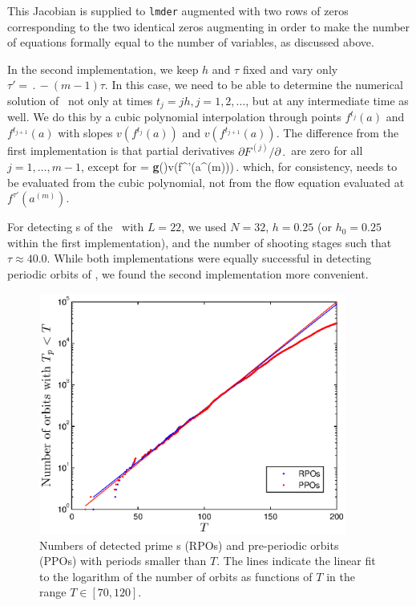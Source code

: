 This Jacobian is supplied to {\tt lmder}
augmented with two rows of zeros corresponding to the two identical
zeros augmenting  in order to make the number of
equations formally equal to the number of variables,
as discussed above.

In the second implementation, we keep $h$ and $\tau$ fixed and vary
only $\tau' = \period{} - (m-1)\tau$.  In this case, we need to be
able to determine the numerical solution of \KSe\ not only at times
$t_j = jh, j = 1, 2, \ldots$, but at any intermediate time as well.
We do this by a cubic polynomial interpolation through points
$f^{t_j}(a)$ and $f^{t_{j+1}}(a)$ with slopes $v(f^{t_j}(a))$ and
$v(f^{t_{j+1}}(a))$.  The difference from the first implementation
is that partial derivatives $\partial F^{(j)}/\partial \period{}$
are zero for all $j = 1,\ldots,m-1$, except for
\beq
   =
  {\bf g}(\shift)v(f^{\tau'}(a^{(m)}))\,.
\eeq
which, for consistency, needs to be evaluated from the cubic
polynomial, not from the flow equation evaluated
at $f^{\tau'}(a^{(m)})$.

For detecting \rpo s of the \KSe\ with $L = 22$, we used
$N = 32$, $h = 0.25$ (or $h_0 = 0.25$ within the first implementation),
and the number of shooting stages such that $\tau \approx 40.0$.
While both implementations were equally successful in detecting
periodic orbits of \KSe , we found the second implementation more
convenient.


\begin{figure}[t]
\begin{center}
\includegraphics[width=0.9\textwidth, clip=true]{figs/ks22_Npos_30k.eps}
\end{center}
\caption{
Numbers of detected prime \rpo s (RPOs) and pre-periodic orbits (PPOs)
with periods smaller than $T$.  The lines indicate the linear fit
to the logarithm of the number of orbits as functions of $T$ in the
range $T \in [70, 120]$.
     } \label{fig:Npos}
\end{figure}

